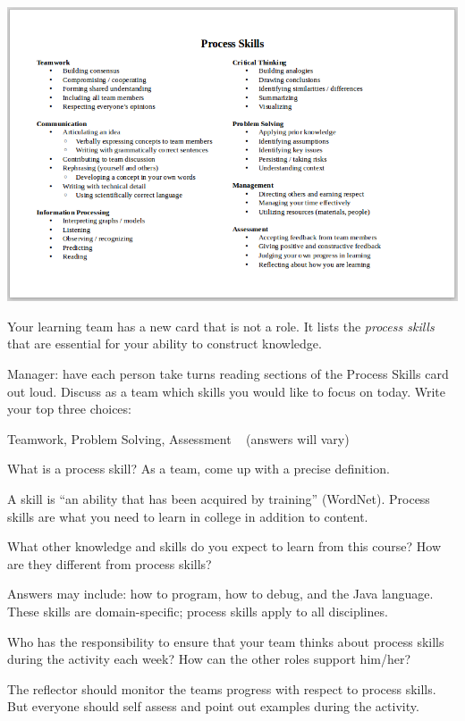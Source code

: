 
\vspace{-1ex}
\begin{multicols}{2}

\begin{center}
\includegraphics[width=0.8\linewidth]{Meta/process1.png}
\end{center}

\columnbreak
\vspace*{2em}

Your learning team has a new card that is not a role.
It lists the \emph{process skills} that are essential for your ability to construct knowledge.

\end{multicols}




\Q Manager: have each person take turns reading sections of the Process Skills card out loud.
Discuss as a team which skills you would like to focus on today.
Write your top three choices:

\begin{answer}
Teamwork, Problem Solving, Assessment ~ (answers will vary)
\end{answer}


\Q What is a process skill?
As a team, come up with a precise definition.

\begin{answer}
A skill is ``an ability that has been acquired by training'' (WordNet).
Process skills are what you need to learn in college in addition to content.
\end{answer}


\Q What other knowledge and skills do you expect to learn from this course?
How are they different from process skills?

\begin{answer}
Answers may include: how to program, how to debug, and the Java language.
These skills are domain-specific; process skills apply to all disciplines.
\end{answer}


\Q Who has the responsibility to ensure that your team thinks about process skills during the activity each week?
How can the other roles support him/her?

\begin{answer}
The reflector should monitor the teams progress with respect to process skills.
But everyone should self assess and point out examples during the activity.
\end{answer}
